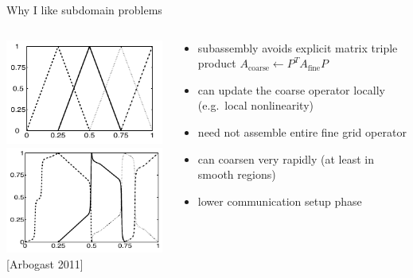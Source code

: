 \begin{frame}{Why I like subdomain problems}
  \begin{columns}
    \begin{column}{0.4\textwidth}
      \includegraphics[width=\textwidth]{figures/ArbogastCoarse} \\
      \includegraphics[width=\textwidth]{figures/ArbogastCoarseMs} \\
      {\small [Arbogast 2011]}
    \end{column}
    \begin{column}{0.6\textwidth}
  \begin{itemize}
  \item subassembly avoids explicit matrix triple product $A_{\text{coarse}} \gets P^T A_{\text{fine}} P$
  \item can update the coarse operator locally (e.g.~local nonlinearity)
  \item need not assemble entire fine grid operator
  \item can coarsen very rapidly (at least in smooth regions)
  \item lower communication setup phase
  \end{itemize}      
    \end{column}
  \end{columns}
\end{frame}
